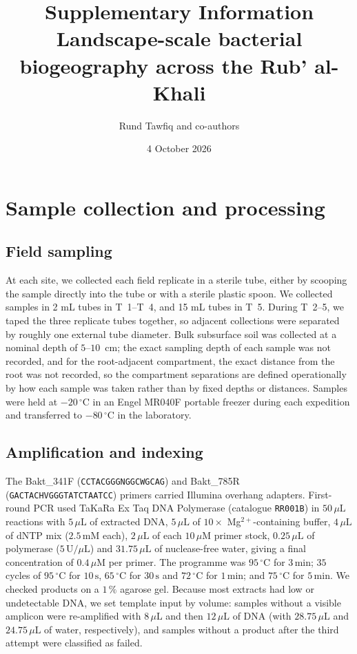 \documentclass[11pt]{article}
\title{Supplementary Information\\
\large Landscape-scale bacterial biogeography across the Rub' al-Khali}
\author{Rund Tawfiq and co-authors}
\date{4 October 2026}
\begin{document}
\maketitle

\section{Sample collection and processing}\label{sup:samplecollection}
\subsection{Field sampling}
At each site, we collected each field replicate in a sterile tube, either by scooping the sample directly into the tube or with a sterile plastic spoon. We collected samples in 2 mL tubes in T~1--T~4, and 15 mL tubes in T~5. During T~2--5, we taped the three replicate tubes together, so adjacent collections were separated by roughly one external tube diameter. Bulk subsurface soil was collected at a nominal depth of $5$--$10$~cm; the exact sampling depth of each sample was not recorded, and for the root-adjacent compartment, the exact distance from the root was not recorded, so the compartment separations are defined operationally by how each sample was taken rather than by fixed depths or distances. Samples were held at $-20\,^{\circ}\mathrm{C}$ in an
Engel MR040F portable freezer during each expedition and transferred to
$-80\,^{\circ}\mathrm{C}$ in the laboratory.

\subsection{Amplification and indexing}\label{sup:sampleprocessing}
The Bakt\_341F (\texttt{CCTACGGGNGGCWGCAG}) and Bakt\_785R
(\texttt{GACTACHVGGGTATCTAATCC}) primers carried Illumina overhang adapters.
First-round PCR used TaKaRa Ex Taq DNA Polymerase (catalogue \texttt{RR001B})
in $50\,\mu\mathrm{L}$ reactions with $5\,\mu\mathrm{L}$ of extracted DNA,
$5\,\mu\mathrm{L}$ of $10\times$ Mg$^{2+}$-containing buffer, $4\,\mu\mathrm{L}$
of dNTP mix ($2.5\,\mathrm{mM}$ each), $2\,\mu\mathrm{L}$ of each
$10\,\mu\mathrm{M}$ primer stock, $0.25\,\mu\mathrm{L}$ of polymerase
($5\,\mathrm{U}/\mu\mathrm{L}$) and $31.75\,\mu\mathrm{L}$ of nuclease-free
water, giving a final concentration of $0.4\,\mu\mathrm{M}$ per primer. The
programme was $95\,^{\circ}\mathrm{C}$ for $3\,\mathrm{min}$; $35$ cycles of
$95\,^{\circ}\mathrm{C}$ for $10\,\mathrm{s}$, $65\,^{\circ}\mathrm{C}$ for
$30\,\mathrm{s}$ and $72\,^{\circ}\mathrm{C}$ for $1\,\mathrm{min}$; and
$75\,^{\circ}\mathrm{C}$ for $5\,\mathrm{min}$. We checked products on a
$1\,\%$ agarose gel. Because most extracts had low or undetectable DNA, we set
template input by volume: samples without a visible amplicon were re-amplified
with $8\,\mu\mathrm{L}$ and then $12\,\mu\mathrm{L}$ of DNA (with
$28.75\,\mu\mathrm{L}$ and $24.75\,\mu\mathrm{L}$ of water, respectively), and
samples without a product after the third attempt were classified as failed.
\end{document}
